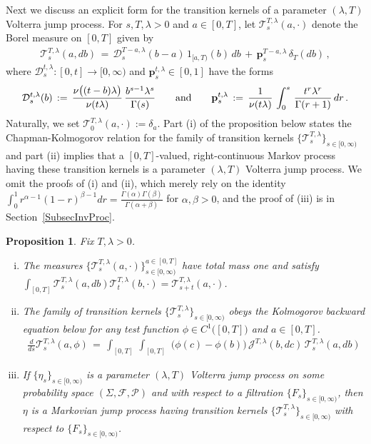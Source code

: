\documentclass[10pt]{article}
\numberwithin{equation}{section}
\newtheorem{proposition}[theorem]{Proposition}
\theoremstyle{definition}
\begin{document}
Next we discuss an explicit form for the transition kernels of a parameter $(\lambda,T)$ Volterra jump process.  For $s,T,\lambda >0$ and $a\in [0,T]$, let $\mathscr{T}^{T,\lambda}_s(a,\cdot)$ denote the Borel measure on $[0,T]$ given by
\begin{align}\label{TFORM}
\mathscr{T}^{T,\lambda}_{s}(a, db)\,=\, \mathcal{D}^{T-a, \lambda}_{ s}(b-a)\,1_{[a ,T
 )}(b)\,db\,+\,\mathbf{p}^{T-a,\lambda}_{s}\,\delta_{T}(db)\,,  
 \end{align}
where  $\mathcal{D}^{t,\lambda}_{s}:[0,t]\rightarrow [0,\infty) $ and $\mathbf{p}^{t,\lambda}_{s}\in [0,1]$ have the forms
 $$ 
 \mathcal{D}^{t,\lambda}_{s}(b)\,:=\,  \frac{ \nu\big((t-b)\lambda  \big)}{ \nu(t\lambda )}\,\frac{b^{s-1}\lambda^s  }{ \Gamma(s) }       \hspace{.7cm} \text{and} \hspace{.7cm} \mathbf{p}^{t,\lambda}_{s}\,:=\,\frac{1}{ \nu(t\lambda )}\,\int_0^s\, \frac{t^r \lambda^r}{\Gamma(r+1)  }\,dr   \,. $$
Naturally,  we set $\mathscr{T}^{T,\lambda}_0(a,\cdot):=\delta_a$.  Part (i) of the proposition  below states the Chapman-Kolmogorov relation for the family of transition kernels $\{ \mathscr{T}^{T,\lambda}_s \}_{s\in [0,\infty)}  $  and part (ii) implies that  a $[0,T]$-valued, right-continuous Markov process  having these transition kernels is a parameter $(\lambda,T)$ Volterra jump process.  We omit the proofs of (i) and (ii), which merely rely on the identity $\int_0^1r^{\alpha-1}(1-r)^{\beta-1}dr=\frac{ \Gamma(\alpha)\Gamma(\beta)  }{\Gamma(\alpha+\beta)  }$ for $\alpha,\beta>0$, and the proof of (iii) is in Section~\ref{SubsecInvProc}. 
\begin{proposition}\label{PropTransMeas} Fix $T,\lambda>0$. 
\begin{enumerate}[(i)]
\item The  measures $\{ \mathscr{T}^{T,\lambda}_s(a,\cdot) \}_{s\in [0,\infty)}^{a\in [0,T] }   $ have total mass one and satisfy  $\int_{[0,T]}\mathscr{T}^{T,\lambda}_{s}(a, db)\mathscr{T}^{T,\lambda}_{t}(b, \cdot)=\mathscr{T}^{T,\lambda}_{s+t}(a, \cdot)$.

\item The family  of  transition kernels $\{ \mathscr{T}^{T,\lambda}_s \}_{s\in [0,\infty)}  $ obeys the  Kolmogorov backward  equation below for any test function $\phi\in C^1\big([0,T]\big)$ and $a\in [0,T]$.
\begin{align*}
\frac{d}{ds} \mathscr{T}^{T,\lambda}_{s}(a, \phi) \,=\, \int_{[0,T]}\,\int_{[0,T]}\, \,\big( \phi(c)-\phi(b)  \big) \,\mathscr{J}^{T, \lambda}(b,dc)   \,\mathscr{T}^{T,\lambda}_{s}(a, db) 
\end{align*}

\item  If $\{ \eta_s \}_{s\in [0,\infty)}$   is a parameter $(\lambda,T)$ Volterra jump process  on some probability space $(\Sigma, \mathcal{F},\mathcal{P})$ and with respect to a filtration  $\{F_s  \}_{s\in [0,\infty)}$, then $\eta$ is a Markovian jump process having transition kernels $\{ \mathscr{T}^{T,\lambda}_s \}_{s\in [0,\infty)}   $ with respect to $\{F_s  \}_{s\in [0,\infty)}$.
\end{enumerate}

\end{proposition}
\end{document}
